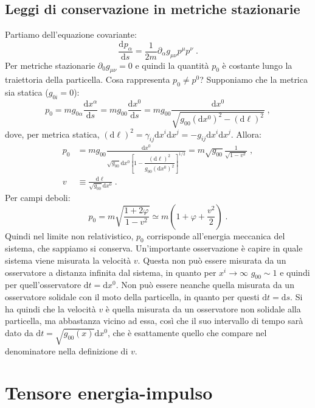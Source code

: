 \documentclass[12pt,a4paper]{report}
\theoremstyle{definition}
\newcommand{\dev}[3][]{\frac{\mathrm{d}^{#1} #2}{\mathrm{d} #3^{#1}}}
\newcommand{\diff}[1][]{\mathrm{d}#1}
\begin{document}
\section{Leggi di conservazione in metriche stazionarie}
Partiamo dell'equazione covariante:
$$
\dev{p_{\alpha}}{s}=\frac{1}{2m}\partial_{\alpha}g_{\mu\nu}p^{\mu}p^{\nu}\;.
$$
Per metriche stazionarie $\partial_0g_{\mu\nu}=0$ e quindi la quantità $p_0$ è costante lungo la traiettoria della particella. Cosa rappresenta $p_0\ne p^0$? Supponiamo che la metrica sia statica ($g_{0i}=0$):
$$
p_0 = mg_{0\alpha}\frac{\diff{x^{\alpha}}}{\diff{s}}=mg_{00}\frac{\diff{x^0}}{\diff{s}}=mg_{00}\frac{\diff{x^0}}{\sqrt{g_{00}(\diff{x^0})^2-(\diff{\ell})^2}}\;,
$$
dove, per metrica statica, $(\diff{\ell})^2=\gamma_{ij}\diff{x^i}\diff{x^j}=-g_{ij}\diff{x^i}\diff{x^j}$. Allora:
\begin{align*}
p_0 &= mg_{00}\frac{\diff{x^0}}{\sqrt{g_{00}}\diff{x^0}\left[1-\dfrac{(\diff{\ell})^2}{g_{00}(\diff{x^0})^2}\right]^{1/2}}= m\sqrt{g_{00}}\frac{1}{\sqrt{1-v^2}}\;,\\
v &\equiv \frac{\diff{\ell}}{\sqrt{g_{00}}\diff{x^0}}\;.
\end{align*}
Per campi deboli:
\begin{equation}
p_0=m\sqrt{\frac{1+2\varphi}{1-v^2}}\simeq m\left(1+\varphi+\frac{v^2}{2}\right)\;.
\end{equation}
Quindi nel limite non relativistico, $p_0$ corrisponde all'energia meccanica del sistema, che sappiamo si conserva. Un'importante osservazione è capire in quale sistema viene misurata la velocità $v$. Questa non può essere misurata da un osservatore a distanza infinita dal sistema, in quanto per $x^i\to \infty$ $g_{00}\sim 1$ e quindi per quell'osservatore $\diff{t}=\diff{x^0}$. Non può essere neanche quella misurata da un osservatore solidale con il moto della particella, in quanto per questi $\diff{t}=\diff{s}$. Si ha quindi che la velocità $v$ è quella misurata da un osservatore non solidale alla particella, ma abbastanza vicino ad essa, così che il suo intervallo di tempo sarà dato da $\diff{t}=\sqrt{g_{00}(x)}\diff{x^0}$, che è esattamente quello che compare nel denominatore nella definizione di $v$.
\chapter{Tensore energia-impulso}
\end{document}
